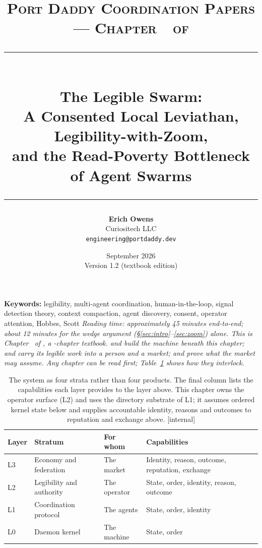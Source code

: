 \documentclass[11pt,a4paper]{article}
\title{
  \vspace{-1cm}
  {\Large\textsc{Port Daddy Coordination Papers --- Chapter~\pdchapternumber\ of \pdchaptercount}}\\[
0.5cm]
  \rule{\textwidth}{0.5pt}\\[0.3cm]
  {\LARGE\textbf{The Legible Swarm:}}\\[0.2cm]
  {\Large A Consented Local Leviathan, Legibility-with-Zoom,\\and the Read-Poverty Bottleneck of Agent Swarms}\\[0.3cm]
  \rule{\textwidth}{0.5pt}
}
\author{
  \textbf{Erich Owens}\\[0.2cm]
  Curiositech LLC\\[0.2cm]
  \texttt{engineering@portdaddy.dev}
}
\date{September 2026\\Version 1.2 (textbook edition)}
\theoremstyle{definition}
\theoremstyle{plain}
\newcounter{protocol}[section]
\begin{document}
\pdopensolutions
\setlength{\emergencystretch}{2em}
\maketitle
\thispagestyle{empty}
\vspace{0.6cm}
\vspace{0.4cm}
\noindent\textbf{Keywords:} legibility, multi-agent coordination, human-in-the-loop,
signal detection theory, context compaction, agent discovery, consent, operator
attention, Hobbes, Scott
\vspace{0.4cm}
\noindent\textit{Reading time: approximately 45 minutes end-to-end; about 12
minutes for the wedge argument (\S\ref{sec:intro}--\ref{sec:zoom}) alone. This is
Chapter~\pdchapternumber{} of \pdbooktitle{}, a \pdchaptercountword-chapter textbook.
 and  build the machine beneath this chapter;  and  carry its legible work into a
person and a market;  and
 prove what the market may assume. Any
chapter can be read first;
Table~\ref{tab:ls-stack-map} shows how they interlock.}
\vspace{0.3cm}
\begin{table}[H]
\centering
\caption{The system as four strata rather than four products. The final column lists the capabilities each layer provides to the layer above. This chapter owns the operator surface (L2) and uses the directory substrate of L1; it assumes ordered kernel state below and supplies accountable identity, reasons and outcomes to reputation and exchange above. [internal]}
\label{tab:ls-stack-map}
\footnotesize
\renewcommand{\arraystretch}{1.22}\setlength{\tabcolsep}{4pt}
\begin{tabularx}{\linewidth}{@{}l >{\raggedright\arraybackslash}p{.24\linewidth}
  >{\raggedright\arraybackslash}p{.20\linewidth} >{\raggedright\arraybackslash}X@{}}
\toprule
\textbf{Layer} & \textbf{Stratum} & \textbf{For whom} & \textbf{Capabilities} \\
\midrule
L3 & Economy and federation & The market & Identity, reason, outcome, reputation, exchange \\
L2 & Legibility and authority & The operator & State, order, identity, reason, outcome \\
L1 & Coordination protocol & The agents & State, order, identity \\
L0 & Daemon kernel & The machine & State, order \\
\bottomrule
\end{tabularx}
\end{table}
\end{document}
